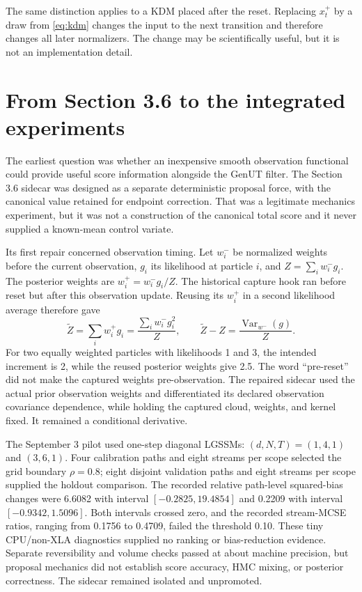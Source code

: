 \documentclass[11pt]{article}
\begin{document}
The same distinction applies to a KDM placed after the reset.  Replacing
$x_t^+$ by a draw from \eqref{eq:kdm} changes the input to the next
transition and therefore changes all later normalizers.  The change may be
scientifically useful, but it is not an implementation detail.

\section{From Section 3.6 to the integrated experiments}
\label{sec:history}

The earliest question was whether an inexpensive smooth observation
functional could provide useful score information alongside the GenUT
filter. The Section 3.6 sidecar was designed as a separate deterministic
proposal force, with the canonical value retained for endpoint correction.
That was a legitimate mechanics experiment, but it was not a construction of
the canonical total score and it never supplied a known-mean control variate.

Its first repair concerned observation timing. Let $w_i^-$ be normalized
weights before the current observation, $g_i$ its likelihood at particle $i$,
and $Z=\sum_i w_i^-g_i$. The posterior weights are $w_i^+=w_i^-g_i/Z$.
The historical capture hook ran before reset but after this observation
update. Reusing its $w_i^+$ in a second likelihood average therefore gave
\begin{equation}
 \widetilde Z=\sum_iw_i^+g_i
 =\frac{\sum_iw_i^-g_i^2}{Z},\qquad
 \widetilde Z-Z=\frac{\operatorname{Var}_{w^-}(g)}{Z}.
 \label{eq:historical-double-observation}
\end{equation}
For two equally weighted particles with likelihoods 1 and 3, the intended
increment is 2, while the reused posterior weights give 2.5. The word
``pre-reset'' did not make the captured weights pre-observation. The repaired
sidecar used the actual prior observation weights and differentiated its
declared observation covariance dependence, while holding the captured cloud,
weights, and kernel fixed. It remained a conditional derivative.

The September 3 pilot used one-step diagonal LGSSMs: $(d,N,T)=(1,4,1)$ and
$(3,6,1)$. Four calibration paths and eight streams per scope selected the
grid boundary $\rho=0.8$; eight disjoint validation paths and eight streams
per scope supplied the holdout comparison. The recorded relative
path-level squared-bias changes were 6.6082 with interval
$[-0.2825,19.4854]$ and 0.2209 with interval $[-0.9342,1.5096]$.
Both intervals crossed zero, and the recorded stream-MCSE ratios, ranging
from 0.1756 to 0.4709, failed the threshold 0.10. These tiny CPU/non-XLA
diagnostics supplied no ranking or bias-reduction evidence. Separate
reversibility and volume checks passed at about machine precision, but
proposal mechanics did not establish score accuracy, HMC mixing, or posterior
correctness. The sidecar remained isolated and unpromoted.
\end{document}
